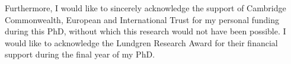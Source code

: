 \begin{acknowledgements}
Furthermore, I would like to sincerely acknowledge the support of Cambridge 
Commonwealth, European and International Trust for my personal funding during 
this PhD, without which this research would not have been possible. I would 
like to acknowledge the Lundgren Research Award for their financial support 
during the final year of my PhD.

\end{acknowledgements}
